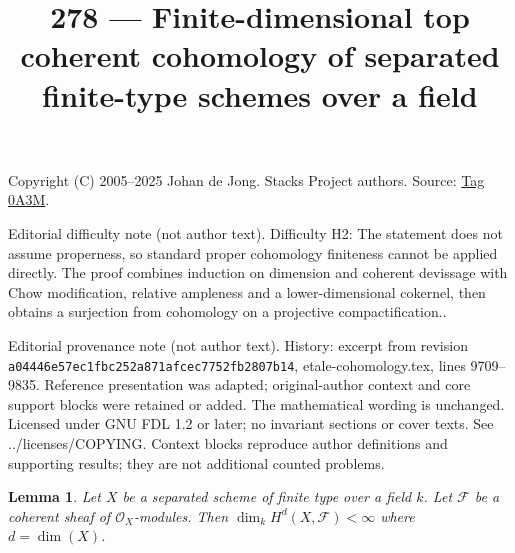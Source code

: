 \documentclass{amsart}
\theoremstyle{plain}
\newtheorem{lemma}[subsection]{Lemma}
\theoremstyle{definition}
\theoremstyle{remark}
\numberwithin{equation}{subsection}
\begin{document}
\title[Stacks Project, Tag 0A3M]{278 --- Finite-dimensional top coherent cohomology of separated finite-type schemes over a field}
\maketitle
\noindent Copyright (C) 2005--2025 Johan de Jong. Stacks Project authors. Source: \href{https://stacks.math.columbia.edu/tag/0A3M}{Tag 0A3M}.

\noindent Editorial difficulty note (not author text). Difficulty H2: The statement does not assume properness, so standard proper cohomology finiteness cannot be applied directly. The proof combines induction on dimension and coherent devissage with Chow modification, relative ampleness and a lower-dimensional cokernel, then obtains a surjection from cohomology on a projective compactification..

\noindent Editorial provenance note (not author text). History: excerpt from revision \texttt{a0444\allowbreak 6e57e\allowbreak c1fbc\allowbreak 252a8\allowbreak 71afc\allowbreak ec775\allowbreak 2fb28\allowbreak 07b14}, etale-cohomology.tex, lines 9709--9835. Reference presentation was adapted; original-author context and core support blocks were retained or added. The mathematical wording is unchanged. Licensed under GNU FDL 1.2 or later; no invariant sections or cover texts. See ../licenses/COPYING. Context blocks reproduce author definitions and supporting results; they are not additional counted problems.

\begin{lemma}
\label{lemma-top-cohomology-coherent}
Let $X$ be a separated scheme of finite type over a field $k$.
Let $\mathcal{F}$ be a coherent sheaf of $\mathcal{O}_X$-modules.
Then $\dim_k H^d(X, \mathcal{F}) < \infty$ where $d = \dim(X)$.
\end{lemma}
\end{document}
